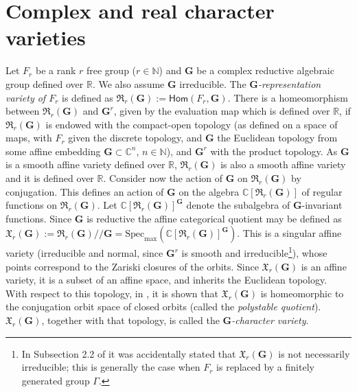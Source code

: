 \documentclass[a4paper,11pt,twoside]{article}
\newcounter{a}
\numberwithin{equation}{section}
\numberwithin{figure}{section}
\theoremstyle{plain}
\theoremstyle{definition}
\theoremstyle{remark}
\theoremstyle{plain}
\theoremstyle{plain}
\theoremstyle{plain}
\begin{document}
\section{Complex and real character varieties}

\label{sec:real-char}

Let $F_{r}$ be a rank $r$ free group ($r\in \mathbb{N}$) and $\mathbf{G}$ be a complex reductive algebraic group
defined over $\mathbb{R}$. We also assume $\mathbf{G}$ irreducible.
The \emph{$\mathbf{G}$-representation
variety of $F_{r}$} is defined as $
\mathfrak{R}_{r}(\mathbf{G}):={\mathsf{Hom}}(F_{r},\mathbf{G}).$
There is a homeomorphism between $\mathfrak{R}_{r}(\mathbf{G})$ and $\mathbf{G}^{r}$, given by the evaluation map which is defined over $\mathbb{R}$,
 if $\mathfrak{R}_{r}(\mathbf{G})$
is endowed with the compact-open topology (as defined on a space of
maps, with $F_{r}$ given the discrete topology, and
$\mathbf{G}$ the Euclidean topology from some affine embedding
$\mathbf{G}\subset \mathbb{C}^n$, $n\in \mathbb{N}$), and $\mathbf{G}^{r}$
with the product topology.
As $\mathbf{G}$ is a smooth affine variety defined over $\mathbb{R}$,
$\mathfrak{R}_{r}(\mathbf{G})$ is also a smooth affine variety and
it is defined over $\mathbb{R}$.
Consider now the action of $\mathbf{G}$ on $\mathfrak{R}_{r}(\mathbf{G})$
by conjugation. This
defines an action of $\mathbf{G}$ on the algebra $\mathbb{C}[\mathfrak{R}_{r}(\mathbf{G})]$
of regular functions on $\mathfrak{R}_{r}(\mathbf{G})$. Let $\mathbb{C}[\mathfrak{R}_{r}(\mathbf{G})]^{\mathbf{G}}$
denote the subalgebra of $\mathbf{G}$-invariant functions.
Since $\mathbf{G}$ is reductive the affine categorical
quotient may be defined as $
\mathfrak{X}_{r}(\mathbf{G}):=\mathfrak{R}_{r}(\mathbf{G})/\!/\mathbf{G}=\mathrm{Spec}_{\max}(\mathbb{C}[\mathfrak{R}_{r}(\mathbf{G})]^{\mathbf{G}})$.
This is a singular affine variety (irreducible and normal, since $\mathbf{G}^r$ is smooth and irreducible\footnote{
In Subsection 2.2 of \cite{Casimiro-Florentino-Lawton-Oliveira:2014} it was accidentally stated that ${\mathfrak{X}}_r({\mathbf{G}})$ is not necessarily irreducible; this is generally the case when $F_r$ is replaced by a finitely generated group $\Gamma$.}), whose points correspond to the Zariski
closures of the orbits. Since ${\mathfrak{X}}_r({\mathbf{G}})$ is an affine variety, it is a subset of an affine space, and inherits the Euclidean topology. With respect to this topology, in \cite{Florentino-Lawton:2013b}, it is shown that ${\mathfrak{X}}_r({\mathbf{G}})$ is homeomorphic to the conjugation orbit space of closed orbits (called the {\it polystable quotient}). $\mathfrak{X}_{r}(\mathbf{G})$, together with that topology, is called the \emph{$\mathbf{G}$-character variety}.
\end{document}
